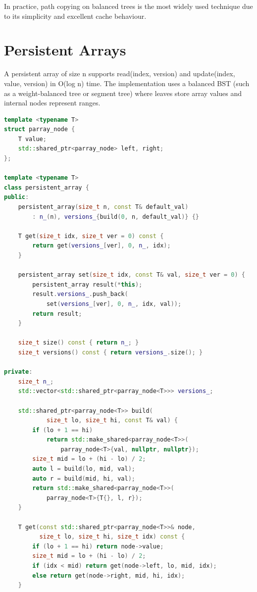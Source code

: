 In practice, path copying on balanced trees is the most widely used technique due to its simplicity and excellent cache behaviour.

\section{Persistent Arrays}\label{sec21:persistent-arrays}

A persistent array of size n supports read(index, version) and update(index, value, version) in O(log n) time. The implementation uses a balanced BST (such as a weight-balanced tree or segment tree) where leaves store array values and internal nodes represent ranges.

\begin{lstlisting}[language=C++]
template <typename T>
struct parray_node {
    T value;
    std::shared_ptr<parray_node> left, right;
};

template <typename T>
class persistent_array {
public:
    persistent_array(size_t n, const T& default_val)
        : n_(n), versions_{build(0, n, default_val)} {}

    T get(size_t idx, size_t ver = 0) const {
        return get(versions_[ver], 0, n_, idx);
    }

    persistent_array set(size_t idx, const T& val, size_t ver = 0) {
        persistent_array result(*this);
        result.versions_.push_back(
            set(versions_[ver], 0, n_, idx, val));
        return result;
    }

    size_t size() const { return n_; }
    size_t versions() const { return versions_.size(); }

private:
    size_t n_;
    std::vector<std::shared_ptr<parray_node<T>>> versions_;

    std::shared_ptr<parray_node<T>> build(
            size_t lo, size_t hi, const T& val) {
        if (lo + 1 == hi)
            return std::make_shared<parray_node<T>>(
                parray_node<T>{val, nullptr, nullptr});
        size_t mid = lo + (hi - lo) / 2;
        auto l = build(lo, mid, val);
        auto r = build(mid, hi, val);
        return std::make_shared<parray_node<T>>(
            parray_node<T>{T{}, l, r});
    }

    T get(const std::shared_ptr<parray_node<T>>& node,
          size_t lo, size_t hi, size_t idx) const {
        if (lo + 1 == hi) return node->value;
        size_t mid = lo + (hi - lo) / 2;
        if (idx < mid) return get(node->left, lo, mid, idx);
        else return get(node->right, mid, hi, idx);
    }


\end{lstlisting}
